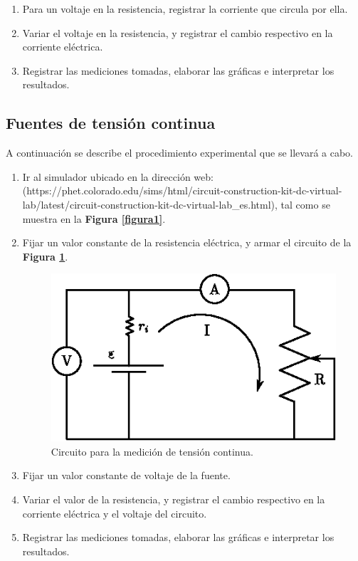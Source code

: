 \documentclass[letter,11pt]{article}
\begin{document}
\begin{enumerate}
\item Para un voltaje en la resistencia, registrar la corriente que circula por
ella.
\item Variar el voltaje en la resistencia, y registrar el cambio respectivo en
la corriente eléctrica.
\item Registrar las mediciones tomadas, elaborar las gráficas e interpretar los
resultados.
\end{enumerate}

\subsection{Fuentes de tensión continua}
A continuación se describe el procedimiento experimental que se llevará a cabo.

\begin{enumerate}
\item Ir al simulador ubicado en la dirección web:
(https://phet.colorado.edu/sims/html/circuit-construction-kit-dc-virtual-lab/latest/circuit-construction-kit-dc-virtual-lab\_es.html),
tal como se muestra en la \textbf{Figura \ref{figura1}}.

\item Fijar un valor constante de la resistencia eléctrica, y armar el circuito
de la \textbf{Figura \ref{figura3}}.

\begin{figure}[!h]
\centering
\includegraphics[scale=1.00]{resources/figura3.eps}
\caption{Circuito para la medición de tensión continua.}
\label{figura3}
\end{figure}

\item Fijar un valor constante de voltaje de la fuente.
\item Variar el valor de la resistencia, y registrar el cambio respectivo en la
    corriente eléctrica y el voltaje del circuito.
\item Registrar las mediciones tomadas, elaborar las gráficas e interpretar los
resultados.
\end{enumerate}
\end{document}
